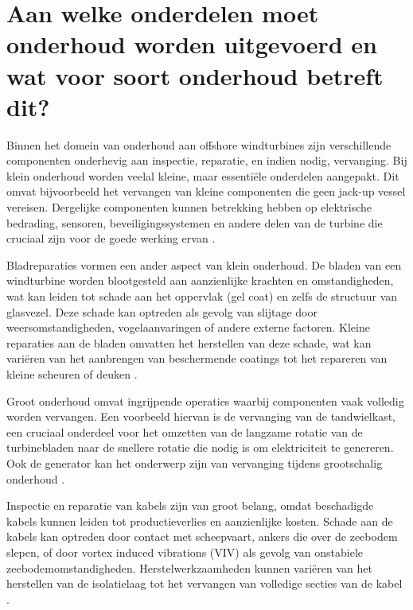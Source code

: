 \section{Aan welke onderdelen moet onderhoud worden uitgevoerd en wat voor soort onderhoud betreft dit?}

Binnen het domein van onderhoud aan offshore windturbines zijn verschillende componenten onderhevig aan inspectie, reparatie, en indien nodig, vervanging. Bij klein onderhoud worden veelal kleine, maar essentiële onderdelen aangepakt. Dit omvat bijvoorbeeld het vervangen van kleine componenten die geen jack-up vessel vereisen. Dergelijke componenten kunnen betrekking hebben op elektrische bedrading, sensoren, beveiligingssystemen en andere delen van de turbine die cruciaal zijn voor de goede werking ervan \cite{Eneco_presentatie}.

Bladreparaties vormen een ander aspect van klein onderhoud. De bladen van een windturbine worden blootgesteld aan aanzienlijke krachten en omstandigheden, wat kan leiden tot schade aan het oppervlak (gel coat) en zelfs de structuur van glasvezel. Deze schade kan optreden als gevolg van slijtage door weersomstandigheden, vogelaanvaringen of andere externe factoren. Kleine reparaties aan de bladen omvatten het herstellen van deze schade, wat kan variëren van het aanbrengen van beschermende coatings tot het repareren van kleine scheuren of deuken \cite{Eneco_presentatie}.

Groot onderhoud omvat ingrijpende operaties waarbij componenten vaak volledig worden vervangen. Een voorbeeld hiervan is de vervanging van de tandwielkast, een cruciaal onderdeel voor het omzetten van de langzame rotatie van de turbinebladen naar de snellere rotatie die nodig is om elektriciteit te genereren. Ook de generator kan het onderwerp zijn van vervanging tijdens grootschalig onderhoud \cite{Eneco_presentatie}.

Inspectie en reparatie van kabels zijn van groot belang, omdat beschadigde kabels kunnen leiden tot productieverlies en aanzienlijke kosten. Schade aan de kabels kan optreden door contact met scheepvaart, ankers die over de zeebodem slepen, of door vortex induced vibrations (VIV) als gevolg van onstabiele zeebodemomstandigheden. Herstelwerkzaamheden kunnen variëren van het herstellen van de isolatielaag tot het vervangen van volledige secties van de kabel \cite{Eneco_presentatie}.